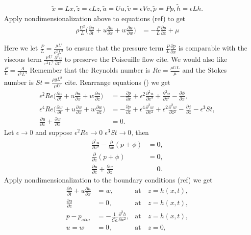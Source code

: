 \documentclass[]{article}
\begin{document}
\begin{align}
	\tilde{x} = Lx, \tilde{z} = \epsilon Lz, \tilde{u} = Uu, \tilde{v} = \epsilon Vv, \tilde{p} = Pp, \tilde{h} = \epsilon Lh.
\end{align}
Apply nondimensionalization above to equations (ref) to get
\begin{align}
	\rho \frac{U^2}{L}\big( \frac{\partial u}{\partial t} + u\frac{\partial u}{\partial x} + w\frac{\partial u}{\partial w} \big) &= -\frac{P}{L}\frac{\partial p}{\partial x} + \mu
\end{align}

Here we let $\frac{P}{L} = \frac{\mu U}{\epsilon^2 L^2}$ to ensure that the pressure term $\frac{P}{L}\frac{\partial p}{\partial x}$ is comparable with the viscous term $\frac{\mu U}{\epsilon^2 L^2}\frac{\partial^2 u}{\partial z^2}$ to preserve the Poiseuille flow cite{}. We would also like $\frac{P}{L} = \frac{A}{\epsilon^3 L^4}$ Remember that the Reynolds number is $Re=\frac{\rho U L}{\mu}$ and the Stokes number is $St=\frac{\rho g L^2}{\mu U}$ cite{}. Rearrange equations () we get
\begin{align}
	\label{nondim_4}
	\epsilon^2 Re\big( \frac{\partial u}{\partial t} + u\frac{\partial u}{\partial x} + w\frac{\partial u}{\partial z} \big) &= -\frac{\partial p}{\partial x} + \epsilon^2 \frac{\partial^2 u}{\partial x^2} + \frac{\partial^2 u}{\partial z^2} - \frac{\partial \phi}{\partial x}, \\
	\label{nondim_5}
	\epsilon^4 Re\big( \frac{\partial w}{\partial t} + u\frac{\partial w}{\partial x} + w\frac{\partial w}{\partial z} \big) &= -\frac{\partial p}{\partial z} + \epsilon^4 \frac{\partial^2 w}{\partial x^2} + \epsilon^2\frac{\partial^2 w}{\partial z^2} - \frac{\partial \phi}{\partial z} - \epsilon^3 St, \\
	\label{nondim_6}
	\frac{\partial u}{\partial x} + \frac{\partial w}{\partial z} &= 0.
\end{align}
Let $\epsilon\to 0$ and suppose $\epsilon^2 Re \to 0$ $\epsilon^3 St \to 0$, then
\begin{align}
	\label{nondim_7}
	\frac{\partial^2 u}{\partial z^2} - \frac{\partial}{\partial x}(p + \phi) &= 0, \\
	\label{nondim_8}
	\frac{\partial}{\partial z}(p + \phi) &= 0, \\
	\label{nondim_9}
	\frac{\partial u}{\partial x} + \frac{\partial w}{\partial z} &= 0.
\end{align}
Apply nondimensionalization to the boundary conditions (ref) we get
\begin{align}
	\label{nonbc_1}
	\frac{\partial h}{\partial t} + u\frac{\partial h}{\partial x} &= w,\quad &\text{at}\quad z=h(x,t), \\
	\label{nonbc_2}
	\frac{\partial u}{\partial z} &= 0,&\text{at}\quad z=h(x,t), \\
	\label{nonbc_3}
	p - p_{atm} &= -\frac{1}{\bar{Ca}}\frac{\partial^2 h}{\partial x^2}, &\text{at}\quad z=h(x,t), \\
	\label{nonbc_4}
	u = w &= 0, & \text{at}\quad z=0,
\end{align}
\end{document}
